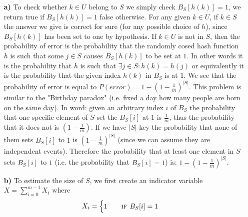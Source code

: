 \documentclass[a4paper]{article}
\begin{document}
\begin{itemize}

\item[\textbf{a)}] To check whether $k\in U$ belong to $S$ we simply check $B_S[h(k)]=1$, we return true if $B_S[h(k)]=1$ false otherwise.
For any given $k\in U$, if $k\in S$ the answer we give is correct for sure (for any possible choice of $h$), since $B_S[h(k)]$ has been set to one by hypothesis.
If $k\in U$ is not in $S$, then the probability of error is the probability that the randomly cosed hash function $h$ is such that some $j \in S$ causes $B_S[h(k)]$ to be set at $1$.
In other words it is the probability that $h$ is such that $\exists j\in S : h(k)=h(j)$ or equivalently it is the probability that the given index $h(k)$ in $B_S$ is at $1$.
We see that the probability of error is equal to $P(error)=1-(1 - \frac{1}{m})^{|S|}$. 
This problem is similar to the "Birthday paradox" (i.e. fixed a day how many people are born on the same day).
In word: 
given an arbitrary index $i$ of $B_S$ the probability that one specific element of $S$ set the $B_S[i]$ at $1$ is $\frac{1}{m}$, thus the probability that it does not is $(1-\frac{1}{m})$.
If we have $|S|$ key the probability that none of them sets $B_S[i]$ to $1$ is $(1 - \frac{1}{m})^{|S|}$ (since we can assume they are independent events).
Therefore the probability that at least one element in $S$ sets $B_S[i]$ to $1$ (i.e. the probability that $B_S[i] = 1$) is: $1-(1 - \frac{1}{m})^{|S|}$.
\item[\textbf{b)}] To estimate the size of $S$, we first create an indicator variable $X=\sum_{i=0}^{m-1}X_i$ where
\begin{equation}
X_{i} =  
\begin{cases} 
1 \qquad \textsc{if }B_S[i]=1\\

\end{cases}
\end{equation}
\end{itemize}
\end{document}
